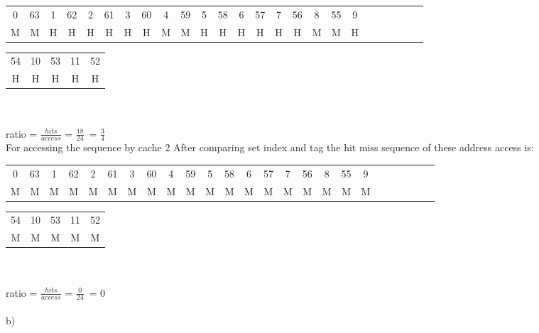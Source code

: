 \documentclass[12pt]{article}
\begin{document}
\begin{enumerate}
	
	\begin{center}
		\begin{tabular}{ |c|c|c|c|c|c|c|c|c|c|c|c|c|c|c|c|c|c|c|c|c|c|c|c|c| } 
			\hline
			0 & 63 & 1& 62 & 2 & 61 & 3 & 60 & 4 & 59 & 5 & 58 & 6 & 57 & 7 & 56 & 8 & 55  & 9   \\ 
			
			M&M&H&H&H&H&H&H&M&M&H&H&H&H&H&H&M&M&H \\  
			\hline
		\end{tabular}
	\end{center}
	
	
	\begin{tabular}{ |c|c|c| c|c|} 
		\hline
		54 & 10 & 53 & 11 & 52 \\ 
		
		H&H&H&H&H \\ 
		
		\hline
	\end{tabular}\\
	\\
	ratio  =
	\(\frac{hits}{access}\) =
	\(\frac{18}{24}\)\      =
	\(\frac{3}{4}\)\     \\
	
	For accessing the sequence by cache 2
	After comparing set index and tag the hit miss sequence of these address access is:\\
	
	
	\begin{center}
		\begin{tabular}{ |c|c|c|c|c|c|c|c|c|c|c|c|c|c|c|c|c|c|c|c|c|c|c|c|c| } 
			\hline
			0 & 63 & 1& 62 & 2 & 61 & 3 & 60 & 4 & 59 & 5 & 58 & 6 & 57 & 7 & 56 & 8 & 55  & 9   \\ 
			
			M&M&M&M&M&M&M&M&M&M&M&M&M&M&M&M&M&M&M \\  
			\hline
		\end{tabular}
	\end{center}
	
	
	\begin{tabular}{ |c|c|c| c|c|} 
		\hline
		54 & 10 & 53 & 11 & 52 \\ 
		
		M&M&M&M&M \\ 
		
		\hline
	\end{tabular}\\
	\\
	ratio  =
	\(\frac{hits}{access}\) =
	\(\frac{0}{24}\)\      =
	0     \\
	\\
	b)
	

\end{enumerate}
\end{document}
